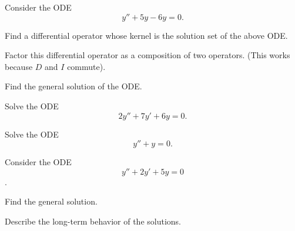
\begin{applicationActivities}

\begin{activity}{10}
Consider the ODE \[y''+5y-6y=0.\]
\vfill
\begin{subactivity}
Find a differential operator whose kernel is the solution set of the above ODE.
\end{subactivity}
\begin{subactivity}
Factor this differential operator as a composition of two operators. (This works because \(D\) and \(I\) commute).
\end{subactivity}
\begin{subactivity}
Find the general solution of the ODE.
\end{subactivity}
\end{activity}

\begin{activity}{10}
Solve the ODE \[ 2y''+7y'+6y=0.\]
\end{activity}

\begin{activity}{15}
Solve the ODE \[ y''+y=0.\]
\end{activity}

\begin{activity}{15}
Consider the ODE \[y''+2y'+5y=0\].
\vfill
\begin{subactivity}
Find the general solution.
\end{subactivity}
\begin{subactivity}
Describe the long-term behavior of the solutions.
\end{subactivity}
\end{activity}


\end{applicationActivities}
